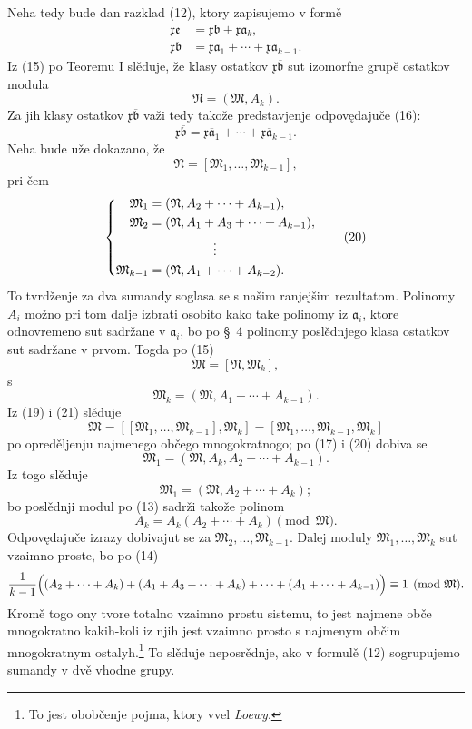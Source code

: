 \documentclass[11pt]{article}
\providecommand{\mM}{\mathfrak M}
\providecommand{\mN}{\mathfrak N}
\providecommand{\ma}{\mathfrak a}
\providecommand{\mb}{\mathfrak b}
\providecommand{\me}{\mathfrak e}
\providecommand{\mx}{\mathfrak x}
\begin{document}
Neha tedy bude dan razklad (12), ktory zapisujemo v formě
\begin{align}
 \mx\me&=\mx\mb+\mx\ma_k,\tag{15}\\
 \mx\mb&=\mx\ma_1+\cdots+\mx\ma_{k-1}.\tag{16}
\end{align}
Iz (15) po Teoremu I slěduje, že klasy ostatkov \(\mx\overline{\mb}\) sut izomorfne grupě ostatkov modula
\begin{equation}
 \mN=(\mM,A_k).
\tag{17}
\end{equation}
Za jih klasy ostatkov \(\mx\overline{\mb}\) važi tedy takože predstavjenje odpovędajuče (16):
\begin{equation}
 \mx\overline{\mb}=\mx\overline{\ma}_1+\cdots+\mx\overline{\ma}_{k-1}.
\tag{18}
\end{equation}
Neha bude uže dokazano, že
\begin{equation}
 \mN=[\mM_1,\ldots,\mM_{k-1}],
\tag{19}
\end{equation}
pri čem
\begin{equation}
\left\{
\begin{aligned}
 \mM_1&=(\mN,A_2+\cdots+A_{k-1}),\\
 \mM_2&=(\mN,A_1+A_3+\cdots+A_{k-1}),\\
 &\hspace{1.8cm}\vdots\\
 \mM_{k-1}&=(\mN,A_1+\cdots+A_{k-2}).
\end{aligned}\right.
\tag{20}
\end{equation}
To tvrdženje za dva sumandy soglasa se s našim ranjejšim rezultatom. Polinomy \(A_i\) možno pri tom dalje izbrati osobito kako take polinomy iz \(\overline{\ma}_i\), ktore odnovremeno sut sadržane v \(\ma_i\), bo po \S~4 polinomy poslědnjego klasa ostatkov sut sadržane v prvom. Togda po (15)
\begin{equation}
 \mM=[\mN,\mM_k],
\tag{21}
\end{equation}
s
\[
 \mM_k=(\mM,A_1+\cdots+A_{k-1}).
\]
Iz (19) i (21) slěduje
\[
 \mM=[[\mM_1,\ldots,\mM_{k-1}],\mM_k]=[\mM_1,\ldots,\mM_{k-1},\mM_k]
\]
po opreděljenju najmenego občego mnogokratnogo; po (17) i (20) dobiva se
\[
 \mM_1=(\mM,A_k,A_2+\cdots+A_{k-1}).
\]
Iz togo slěduje
\[
 \mM_1=(\mM,A_2+\cdots+A_k);
\]
bo poslědnji modul po (13) sadrži takože polinom
\[
 A_k=A_k(A_2+\cdots+A_k)\pmod{\mM}.
\]
Odpovędajuče izrazy dobivajut se za \(\mM_2,\ldots,\mM_{k-1}\). Dalej moduly \(\mM_1,\ldots,\mM_k\) sut vzaimno proste, bo po (14)
\[
 \frac{1}{k-1}\Bigl((A_2+\cdots+A_k)+(A_1+A_3+\cdots+A_k)+\cdots+(A_1+\cdots+A_{k-1})\Bigr)\equiv1\pmod{\mM}.
\]
Kromě togo ony tvore totalno vzaimno prostu sistemu, to jest najmene obče mnogokratno kakih-koli iz njih jest vzaimno prosto s najmenym občim mnogokratnym ostalyh.\footnote{To jest obobčenje pojma, ktory vvel \emph{Loewy}.} To slěduje neposrědnje, ako v formulě (12) sogrupujemo sumandy v dvě vhodne grupy.
\end{document}
